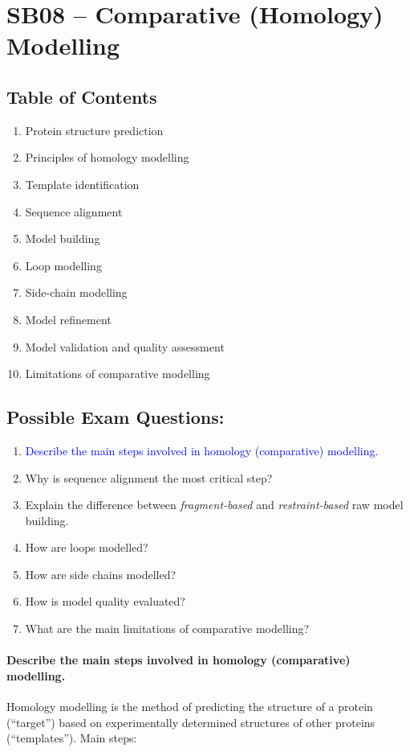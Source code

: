 \section{SB08 -- Comparative (Homology) Modelling \done}

\subsection*{Table of Contents}

\begin{enumerate}
\item Protein structure prediction
\item Principles of homology modelling
\item Template identification
\item Sequence alignment
\item Model building
\item Loop modelling
\item Side-chain modelling
\item Model refinement
\item Model validation and quality assessment
\item Limitations of comparative modelling
\end{enumerate}


\subsection*{Possible Exam Questions:}

\begin{enumerate}
\item{\textcolor{blue}{Describe the main steps involved in homology (comparative) modelling.} \done}
\item{Why is sequence alignment the most critical step? \done}
\item{Explain the difference between \textit{fragment-based} and \textit{restraint-based} raw model building. \done}
\item {How are loops modelled? \done}
\item{How are side chains modelled? \done}
\item{How is model quality evaluated? \done}
\item{What are the main limitations of comparative modelling? \done}
\end{enumerate}


\paragraph{Describe the main steps involved in homology (comparative) modelling.}
Homology modelling is the method of predicting the structure of a protein (“target”) based on
experimentally determined structures of other proteins (“templates”). Main steps:

